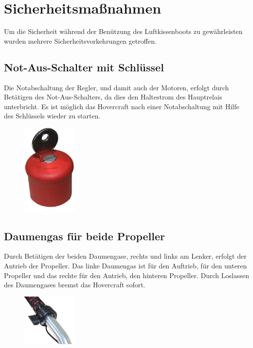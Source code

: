 
\section{Sicherheitsmaßnahmen}
Um die Sicherheit während der Benützung des Luftkissenboots zu gewährleisten wurden mehrere Sicherheitsvorkehrungen getroffen.
\subsection{Not-Aus-Schalter mit Schlüssel}
Die Notabschaltung der Regler, und damit auch der Motoren, erfolgt durch Betätigen des Not-Aus-Schalters, da dies den Haltestrom des Hauptrelais unterbricht. 
Es ist möglich das Hovercraft nach einer Notabschaltung mit Hilfe des Schlüssels wieder zu starten. 

\begin{figure}[h]
    \centering
    \includegraphics[width=0.25\textwidth]{Fotos/Notaus.png}
\end{figure}
  
\newpage
\subsection{Daumengas für beide Propeller}
Durch Betätigen der beiden Daumengase, rechts und links am Lenker, erfolgt der Antrieb der Propeller. Das linke Daumengas ist für den Auftrieb, für den unteren Propeller und
das rechte für den Antrieb, den hinteren Propeller. Durch Loslassen des Daumengases bremst das Hovercraft sofort.

\begin{figure}[h]
    \centering
    \includegraphics[width=0.25\textwidth]{Fotos/Daumengas.png}
\end{figure}


